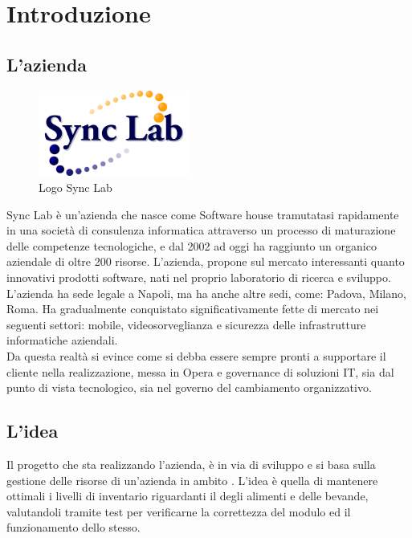
\chapter{Introduzione}
\section{L'azienda}
\begin{figure}[H]
	\begin{center} \includegraphics[width=5cm]{figures/logo_synclab}
		\caption[Logo Sync Lab]{Logo Sync Lab} 
		\label{logo_python} 
	\end{center}
\end{figure}
Sync Lab è un'azienda che nasce come Software house tramutatasi rapidamente in una società di consulenza informatica attraverso un processo di maturazione delle competenze tecnologiche, e dal 2002 ad oggi ha raggiunto un organico aziendale di oltre 200 risorse.
L'azienda, propone sul mercato interessanti quanto innovativi prodotti software, nati nel proprio laboratorio di ricerca e sviluppo.\\
L'azienda ha sede legale a Napoli, ma ha anche altre sedi, come: Padova, Milano, Roma. 
Ha gradualmente conquistato significativamente fette di mercato nei seguenti settori: mobile, videosorveglianza e sicurezza delle infrastrutture informatiche aziendali.\\
Da questa realtà si evince come si debba essere sempre pronti a supportare il cliente nella realizzazione, messa in Opera e governance di soluzioni IT, sia dal punto di vista tecnologico, sia nel governo del cambiamento organizzativo.

\section{L'idea}
Il progetto che sta realizzando l'azienda, è in via di sviluppo e si basa sulla gestione delle risorse di un'azienda in ambito .
L'idea è quella di mantenere ottimali i livelli di inventario riguardanti il  degli alimenti e delle bevande, valutandoli tramite test per verificarne la correttezza del modulo ed il funzionamento dello stesso.

